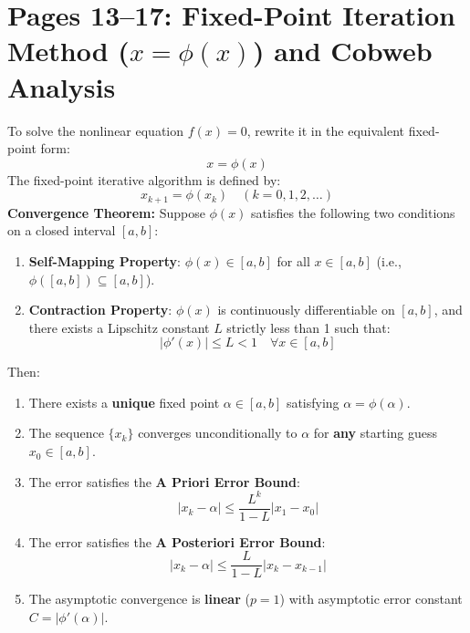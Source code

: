 \section{Pages 13--17: Fixed-Point Iteration Method \texorpdfstring{($x = \phi(x)$)}{(x = phi(x))} and Cobweb Analysis}
\label{sec:page13_17_fixed_point}

\begin{theorembox}
To solve the nonlinear equation $f(x) = 0$, rewrite it in the equivalent fixed-point form:
\begin{equation}
    x = \phi(x)
\end{equation}
The fixed-point iterative algorithm is defined by:
\begin{equation}
    \boxed{x_{k+1} = \phi(x_k)} \quad (k = 0, 1, 2, \dots)
\end{equation}
\textbf{Convergence Theorem:} Suppose $\phi(x)$ satisfies the following two conditions on a closed interval $[a, b]$:
\begin{enumerate}
    \item \textbf{Self-Mapping Property}: $\phi(x) \in [a, b]$ for all $x \in [a, b]$ (i.e., $\phi([a, b]) \subseteq [a, b]$).
    \item \textbf{Contraction Property}: $\phi(x)$ is continuously differentiable on $[a, b]$, and there exists a Lipschitz constant $L$ strictly less than 1 such that:
    \begin{equation}
        \boxed{|\phi'(x)| \le L < 1 \quad \forall x \in [a, b]}
    \end{equation}
\end{enumerate}
Then:
\begin{enumerate}[label=(\alph*)]
    \item There exists a \textbf{unique} fixed point $\alpha \in [a, b]$ satisfying $\alpha = \phi(\alpha)$.
    \item The sequence $\{x_k\}$ converges unconditionally to $\alpha$ for \textbf{any} starting guess $x_0 \in [a, b]$.
    \item The error satisfies the \textbf{A Priori Error Bound}:
    \begin{equation}
        \boxed{|x_k - \alpha| \le \frac{L^k}{1 - L} |x_1 - x_0|}
    \end{equation}
    \item The error satisfies the \textbf{A Posteriori Error Bound}:
    \begin{equation}
        \boxed{|x_k - \alpha| \le \frac{L}{1 - L} |x_k - x_{k-1}|}
    \end{equation}
    \item The asymptotic convergence is \textbf{linear} ($p = 1$) with asymptotic error constant $C = |\phi'(\alpha)|$.
\end{enumerate}
\end{theorembox}

